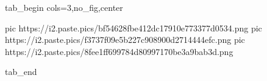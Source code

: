  
 
 
 
 


\ifcmt
  tab_begin cols=3,no_fig,center

     pic https://i2.paste.pics/bf54628fbe412dc17910e773377d0534.png
		 pic https://i2.paste.pics/f3737f09e5b227c908900d2714444efc.png
		 pic https://i2.paste.pics/8fee1ff699784d80997170be3a9bab3d.png

  tab_end
\fi
